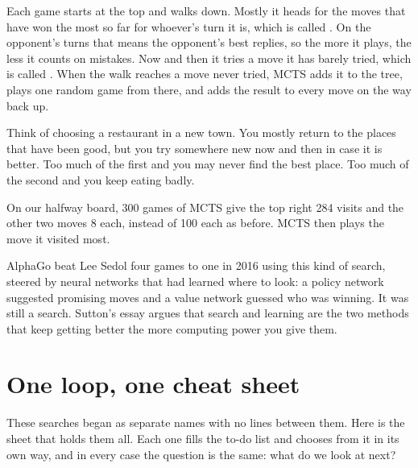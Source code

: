 Each game starts at the top and walks down. Mostly it heads for the moves that have won the most so far for whoever's turn it is, which is called . On the opponent's turns that means the opponent's best replies, so the more it plays, the less it counts on mistakes. Now and then it tries a move it has barely tried, which is called . When the walk reaches a move never tried, MCTS adds it to the tree, plays one random game from there, and adds the result to every move on the way back up.

\begin{analogy}
Think of choosing a restaurant in a new town. You mostly return to the places that have been good, but you try somewhere new now and then in case it is better. Too much of the first and you may never find the best place. Too much of the second and you keep eating badly.
\end{analogy}

On our halfway board, 300 games of MCTS give the top right 284 visits and the other two moves 8 each, instead of 100 each as before. MCTS then plays the move it visited most.

\begin{libnote}
AlphaGo beat Lee Sedol four games to one in 2016 using this kind of search, steered by neural networks that had learned where to look: a policy network suggested promising moves and a value network guessed who was winning. It was still a search. Sutton's essay argues that search and learning are the two methods that keep getting better the more computing power you give them.
\end{libnote}

\section{One loop, one cheat sheet}

These searches began as separate names with no lines between them. Here is the sheet that holds them all. Each one fills the to-do list and chooses from it in its own way, and in every case the question is the same: what do we look at next?

